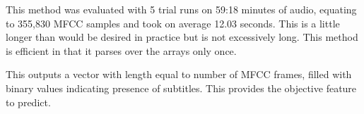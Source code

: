 This method was evaluated with 5 trial runs on 59:18 minutes of audio, equating to 355,830 MFCC samples and took on average 12.03 seconds. This is a little longer than would be desired in practice but is not excessively long. This method is efficient in that it parses over the arrays only once.

This outputs a vector with length equal to number of MFCC frames, filled with binary values indicating presence of subtitles. This provides the objective feature to predict.


